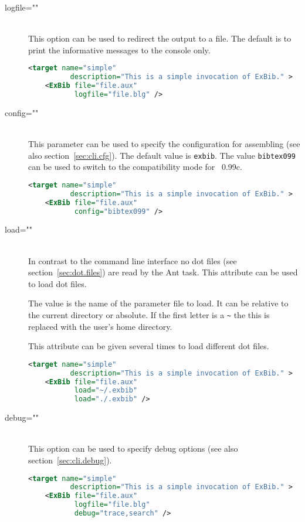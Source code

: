 \begin{description}
\item[logfile=""] \ \\  
  This option can be used to redirect the output to a file. The
  default is to print the informative messages to the console only.

\begin{lstlisting}[language=XML,morekeywords={target}]
  <target name="simple"
          description="This is a simple invocation of ExBib." >
    <ExBib file="file.aux"
           logfile="file.blg" />
\end{lstlisting}

\item[config=""] \ \\
  This parameter can be used to specify the configuration for
  assembling \ExBib{} (see also section~\ref{sec:cli.cfg}). The
  default value is \texttt{exbib}. The value \texttt{bibtex099} can be
  used to switch to the compatibility mode for
  \BibTeX~0.99c.

\begin{lstlisting}[language=XML,morekeywords={target}]
  <target name="simple"
          description="This is a simple invocation of ExBib." >
    <ExBib file="file.aux"
           config="bibtex099" />
\end{lstlisting}
  
\item[load=""] \ \\
  In contrast to the command line interface no dot files (see
  section~\ref{sec:dot.files}) are read by the Ant task. This
  attribute can be used to load dot files.
  
  The value is the name of the parameter file to load. It can be
  relative to the current directory or absolute.  If the first letter
  is a \verb|~| the this is replaced with the user's home directory.

  This attribute can be given several times to load different dot
  files.

\begin{lstlisting}[language=XML,morekeywords={target}]
  <target name="simple"
          description="This is a simple invocation of ExBib." >
    <ExBib file="file.aux"
           load="~/.exbib"
           load="./.exbib" />
\end{lstlisting}

\item[debug=""] \ \\
  This option can be used to specify debug options (see also
  section~\ref{sec:cli.debug}).

\begin{lstlisting}[language=XML,morekeywords={target}]
  <target name="simple"
          description="This is a simple invocation of ExBib." >
    <ExBib file="file.aux"
           logfile="file.blg"
           debug="trace,search" />
\end{lstlisting}

\end{description}


\endinput
%
